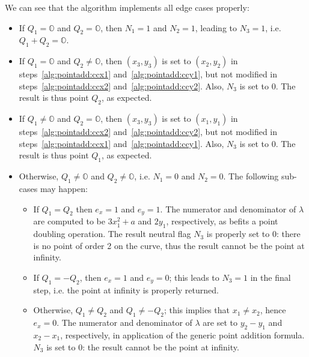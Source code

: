 \documentclass{llncs}
\newcommand{\neutral}{\mathbb{O}}
\begin{document}
We can see that the algorithm implements all edge cases properly:
\begin{itemize}

    \item If $Q_1 = \neutral$ and $Q_2 = \neutral$, then $N_1 = 1$ and
    $N_2 = 1$, leading to $N_3 = 1$, i.e. $Q_1 + Q_2 = \neutral$.

    \item If $Q_1 = \neutral$ and $Q_2 \neq \neutral$, then $(x_3,y_3)$
    is set to $(x_2,y_2)$ in steps~\ref{alg:pointadd:ccx1}
    and~\ref{alg:pointadd:ccy1}, but not modified in
    steps~\ref{alg:pointadd:ccx2} and~\ref{alg:pointadd:ccy2}. Also,
    $N_3$ is set to $0$. The result is thus point $Q_2$, as expected.

    \item If $Q_1 \neq \neutral$ and $Q_2 = \neutral$, then $(x_3,y_3)$
    is set to $(x_1,y_1)$ in steps~\ref{alg:pointadd:ccx2}
    and~\ref{alg:pointadd:ccy2}, but not modified in
    steps~\ref{alg:pointadd:ccx1} and~\ref{alg:pointadd:ccy1}. Also,
    $N_3$ is set to $0$. The result is thus point $Q_1$, as expected.

    \item Otherwise, $Q_1 \neq \neutral$ and $Q_2 \neq \neutral$, i.e.
    $N_1 = 0$ and $N_2 = 0$. The following sub-cases may happen:
    \begin{itemize}

        \item If $Q_1 = Q_2$ then $e_x = 1$ and $e_y = 1$. The numerator
        and denominator of $\lambda$ are computed to be $3x_1^2+a$ and
        $2y_1$, respectively, as befits a point doubling operation. The
        result neutral flag $N_3$ is properly set to $0$: there is no
        point of order 2 on the curve, thus the result cannot be the
        point at infinity.

        \item If $Q_1 = -Q_2$, then $e_x = 1$ and $e_y = 0$; this leads
        to $N_3 = 1$ in the final step, i.e. the point at infinity is
        properly returned.

        \item Otherwise, $Q_1 \neq Q_2$ and $Q_1 \neq -Q_2$; this
        implies that $x_1 \neq x_2$, hence $e_x = 0$. The numerator and
        denominator of $\lambda$ are set to $y_2 - y_1$ and $x_2 - x_1$,
        respectively, in application of the generic point addition
        formula. $N_3$ is set to $0$: the result cannot be the
        point at infinity.

    \end{itemize}

\end{itemize}
\end{document}
